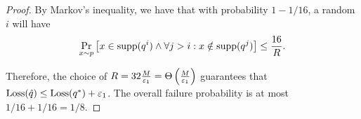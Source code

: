 \begin{proof}
By Markov's inequality, we have that with probability $1-1/16$, a random $i$ will have $$\Pr_{x\sim p}\left[ x \in \text{supp}(q^i) \wedge \forall j > i: x \notin \text{supp}(q^j) \right] \le \frac {16} R.$$

Therefore, the choice of $R = 32 \frac M {\varepsilon_1} = \Theta \left( \frac { M } {\varepsilon_1} \right)$ guarantees that $\text{Loss}(\hat q) \le \text{Loss}(q^*) + {\varepsilon_1}$.
The overall failure probability is at most $1/16+ 1/16 = 1/8$.

\end{proof}
